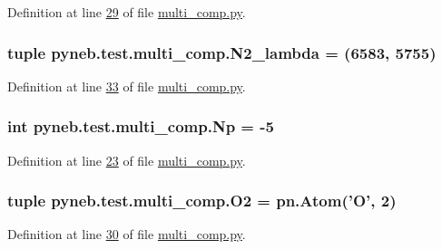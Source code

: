 Definition at line \hyperlink{multi__comp_8py_source_l00029}{29} of file \hyperlink{multi__comp_8py_source}{multi\-\_\-comp.\-py}.

\hypertarget{namespacepyneb_1_1test_1_1multi__comp_a221d8a406c3127c62480d7f3bc0149e3}{
\subsubsection[{N2\-\_\-lambda}]{\setlength{\rightskip}{0pt plus 5cm}tuple pyneb.\-test.\-multi\-\_\-comp.\-N2\-\_\-lambda = (6583, 5755)}}\label{namespacepyneb_1_1test_1_1multi__comp_a221d8a406c3127c62480d7f3bc0149e3}


Definition at line \hyperlink{multi__comp_8py_source_l00033}{33} of file \hyperlink{multi__comp_8py_source}{multi\-\_\-comp.\-py}.

\hypertarget{namespacepyneb_1_1test_1_1multi__comp_a730973bb5d66cde8c39de757702e2116}{
\subsubsection[{Np}]{\setlength{\rightskip}{0pt plus 5cm}int pyneb.\-test.\-multi\-\_\-comp.\-Np = -\/5}}\label{namespacepyneb_1_1test_1_1multi__comp_a730973bb5d66cde8c39de757702e2116}


Definition at line \hyperlink{multi__comp_8py_source_l00023}{23} of file \hyperlink{multi__comp_8py_source}{multi\-\_\-comp.\-py}.

\hypertarget{namespacepyneb_1_1test_1_1multi__comp_a823eed65ec2dc8d8c130674f0fed04c7}{
\subsubsection[{O2}]{\setlength{\rightskip}{0pt plus 5cm}tuple pyneb.\-test.\-multi\-\_\-comp.\-O2 = pn.\-Atom('O', 2)}}\label{namespacepyneb_1_1test_1_1multi__comp_a823eed65ec2dc8d8c130674f0fed04c7}


Definition at line \hyperlink{multi__comp_8py_source_l00030}{30} of file \hyperlink{multi__comp_8py_source}{multi\-\_\-comp.\-py}.

